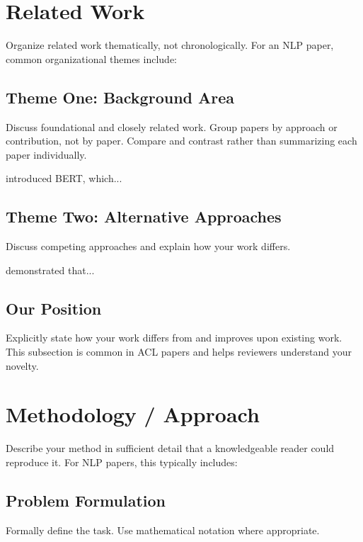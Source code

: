 \documentclass[11pt,a4paper]{article}
\begin{document}
\section{Related Work}

Organize related work thematically, not chronologically. For an NLP paper, 
common organizational themes include:

\subsection{Theme One: Background Area}

Discuss foundational and closely related work. Group papers by approach or 
contribution, not by paper. Compare and contrast rather than summarizing 
each paper individually.

\citet{devlin2019bert} introduced BERT, which...

\subsection{Theme Two: Alternative Approaches}

Discuss competing approaches and explain how your work differs.

\citet{brown2020language} demonstrated that...

\subsection{Our Position}

Explicitly state how your work differs from and improves upon existing work. 
This subsection is common in ACL papers and helps reviewers understand your 
novelty.

\section{Methodology / Approach}

Describe your method in sufficient detail that a knowledgeable reader could 
reproduce it. For NLP papers, this typically includes:

\subsection{Problem Formulation}

Formally define the task. Use mathematical notation where appropriate.
\end{document}
